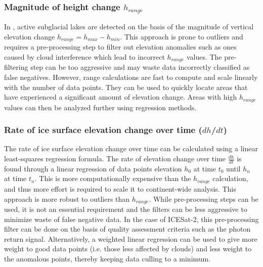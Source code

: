 \subsubsection{Magnitude of height change $h_{range}$}

In \citet{Smithinventoryactivesubglacial2009,SiegfriedThirteenyearssubglacial2018}, active subglacial lakes are detected on the basis of the magnitude of vertical elevation change $h_{range} = h_{max} - h_{min}$.
This approach is prone to outliers and requires a pre-processing step to filter out elevation anomalies such as ones caused by cloud interference which lead to incorrect $h_{range}$ values.
The pre-filtering step can be too aggressive and may waste data incorrectly classified as false negatives.
However, range calculations are fast to compute and scale linearly with the number of data points.
They can be used to quickly locate areas that have experienced a significant amount of elevation change.
Areas with high $h_{range}$ values can then be analyzed further using regression methods.

\subsubsection{Rate of ice surface elevation change over time ($dh$/$dt$)}

The rate of ice surface elevation change over time can be calculated using a linear least-squares regression formula.
The rate of elevation change over time $\frac{dh}{dt}$ is found through a linear regression of data points elevation $h_0$ at time $t_0$ until $h_n$ at time $t_n$.
This is more computationally expensive than the $h_{range}$ calculation, and thus more effort is required to scale it to continent-wide analysis.
This approach is more robust to outliers than $h_{range}$.
While pre-processing steps can be used, it is not an essential requirement and the filters can be less aggressive to minimize waste of false negative data.
In the case of ICESat-2, this pre-processing filter can be done on the basis of quality assessment criteria such as the photon return signal.
Alternatively, a weighted linear regression can be used to give more weight to good data points (i.e. those less affected by clouds) and less weight to the anomalous points, thereby keeping data culling to a minimum.

